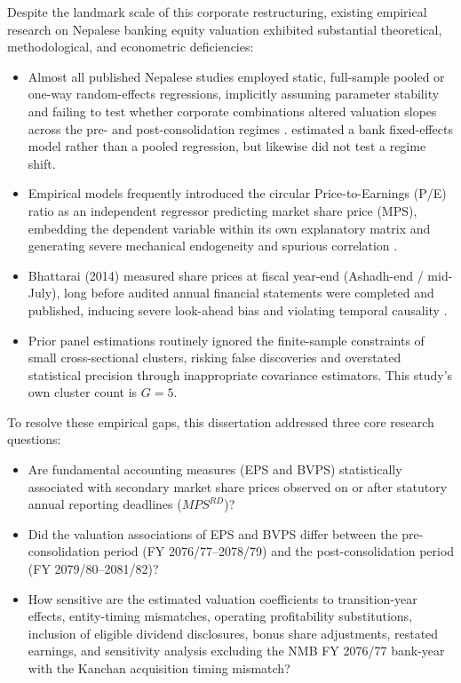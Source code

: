 Despite the landmark scale of this corporate restructuring, existing empirical research on Nepalese banking equity valuation exhibited substantial theoretical, methodological, and econometric deficiencies:
\begin{itemize}
    \item Almost all published Nepalese studies employed static, full-sample pooled or one-way random-effects regressions, implicitly assuming parameter stability and failing to test whether corporate combinations altered valuation slopes across the pre- and post-consolidation regimes \citep{chaudhari2025,chhetri2023,timalsina2026}. \citet{gurungdahal2025} estimated a bank fixed-effects model rather than a pooled regression, but likewise did not test a regime shift.
    \item Empirical models frequently introduced the circular Price-to-Earnings (P/E) ratio as an independent regressor predicting market share price (MPS), embedding the dependent variable within its own explanatory matrix and generating severe mechanical endogeneity and spurious correlation \citep{bhattarai2014,giri2024,joshi2023,pant2024}.
    \item Bhattarai (2014) measured share prices at fiscal year-end (Ashadh-end / mid-July), long before audited annual financial statements were completed and published, inducing severe look-ahead bias and violating temporal causality \citep{bhattarai2014}.
    \item Prior panel estimations routinely ignored the finite-sample constraints of small cross-sectional clusters, risking false discoveries and overstated statistical precision through inappropriate covariance estimators. This study's own cluster count is $G = 5$.
\end{itemize}

To resolve these empirical gaps, this dissertation addressed three core research questions:
\begin{itemize}
    \item Are fundamental accounting measures (EPS and BVPS) statistically associated with secondary market share prices observed on or after statutory annual reporting deadlines ($\mathit{MPS}^{RD}$)?
    \item Did the valuation associations of EPS and BVPS differ between the pre-consolidation period (FY 2076/77--2078/79) and the post-consolidation period (FY 2079/80--2081/82)?
    \item How sensitive are the estimated valuation coefficients to transition-year effects, entity-timing mismatches, operating profitability substitutions, inclusion of eligible dividend disclosures, bonus share adjustments, restated earnings, and sensitivity analysis excluding the NMB FY 2076/77 bank-year with the Kanchan acquisition timing mismatch?
\end{itemize}


